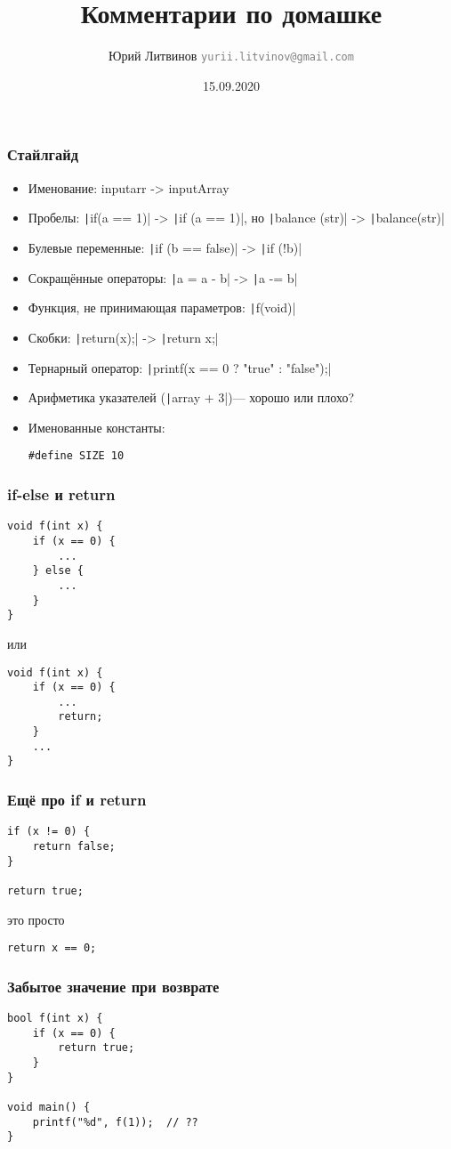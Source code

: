 \documentclass[xetex,mathserif,serif]{beamer}
\title{Комментарии по домашке}
\author[Юрий Литвинов]{Юрий Литвинов \newline \textcolor{gray}{\small\texttt{yurii.litvinov@gmail.com}}}
\date{15.09.2020}
\begin{document}
    
    \frame{\titlepage}
    
    \begin{frame}[fragile]
        \frametitle{Стайлгайд}
        \begin{itemize}
            \item Именование: inputarr -> inputArray
            \item Пробелы: \texttt|if(a == 1)| -> \texttt|if (a == 1)|, но \texttt|balance (str)| -> \texttt|balance(str)|
            \item Булевые переменные: \texttt|if (b == false)| -> \texttt|if (!b)|
            \item Сокращённые операторы: \texttt|a = a - b| -> \texttt|a -= b|
            \item Функция, не принимающая параметров: \texttt|f(void)|
            \item Скобки: \texttt|return(x);| -> \texttt|return x;|
            \item Тернарный оператор: \texttt|printf(x == 0 ? "true" :  "false");|
            \item Арифметика указателей (\texttt|array + 3|)--- хорошо или плохо?
            \item Именованные константы: 
                \begin{verbatim}
#define SIZE 10
                \end{verbatim}
        \end{itemize}
    \end{frame}

    \begin{frame}[fragile]
        \frametitle{if-else и return}
        \begin{verbatim}
void f(int x) {
    if (x == 0) {
        ...
    } else {
        ...
    }
}
        \end{verbatim}
        или
        \begin{verbatim}
void f(int x) {
    if (x == 0) {
        ...
        return;
    } 
    ...
}
        \end{verbatim}
    \end{frame}

    \begin{frame}[fragile]
        \frametitle{Ещё про if и return}
        \begin{verbatim}
if (x != 0) {
    return false;
}

return true;
        \end{verbatim}
        \vspace{1cm}
        это просто
        \begin{verbatim}
return x == 0;
        \end{verbatim}
    \end{frame}

    \begin{frame}[fragile]
        \frametitle{Забытое значение при возврате}
        \begin{verbatim}
bool f(int x) {
    if (x == 0) {
        return true;
    }
}

void main() {
    printf("%d", f(1));  // ??
}
        \end{verbatim}
    \end{frame}
\end{document}
